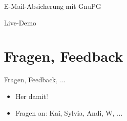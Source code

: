   \begin{frame}{E-Mail-Absicherung mit GnuPG}
    \begin{centering}
      \Huge Live-Demo
    \end{centering}
  \end{frame}

\section{Fragen, Feedback}
  \begin{frame}{Fragen, Feedback, ...}
    \begin{itemize}
      \item{Her damit!}
      \item{Fragen an: Kai, Sylvia, Andi, W, ...}
    \end{itemize}
  \end{frame}
